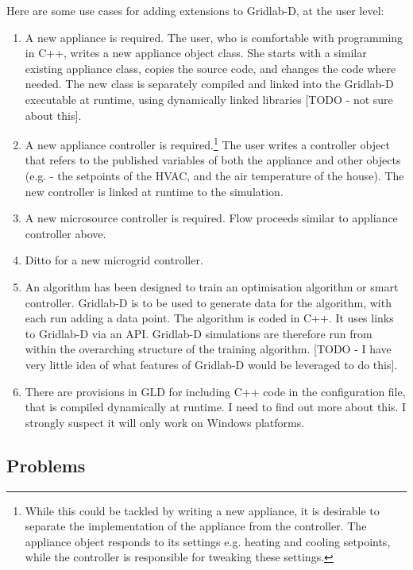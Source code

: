 \documentclass[12pt]{article}
\begin{document}
Here are some use cases for adding extensions to Gridlab-D, at the user level: \begin{enumerate}
\item A new appliance is required. The user, who is comfortable with programming in C++, writes a new appliance object class.  She starts with a similar existing appliance class, copies the source code, and changes the code where needed. The new class is separately compiled and linked into the Gridlab-D executable at runtime, using dynamically linked libraries [TODO - not sure about this].
\item A new appliance controller is required.\footnote{While this could be tackled by writing a new appliance, it is desirable to separate the implementation of the appliance from the controller. The appliance object responds to its settings e.g. heating and cooling setpoints, while the controller is responsible for tweaking these settings.} The user writes a controller object that refers to the published variables of both the appliance and other objects (e.g. - the setpoints of the HVAC, and the air temperature of the house). The new controller is linked at runtime to the simulation.
\item A new microsource controller is required. Flow proceeds similar to appliance controller above.
\item Ditto for a new microgrid controller.
\item An algorithm has been designed to train an optimisation algorithm or smart controller. Gridlab-D is to be used to generate data for the algorithm, with each run adding a data point. The algorithm is coded in C++. It uses links to Gridlab-D via an API. Gridlab-D simulations are therefore run from within the overarching structure of the training algorithm. [TODO - I have very little idea of what features of Gridlab-D would be leveraged to do this].
\item There are provisions in GLD for including C++ code in the configuration file, that is compiled dynamically at runtime. I need to find out more about this. I strongly suspect it will only work on Windows platforms.
\end{enumerate}

\subsection{Problems} 
\end{document}
